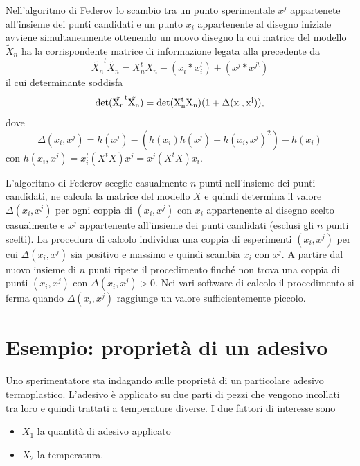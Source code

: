 \documentclass[
  11pt,
]{book}
\providecommand{\tightlist}{%
  \setlength{\itemsep}{0pt}\setlength{\parskip}{0pt}}
\begin{document}
Nell'algoritmo di Federov lo scambio tra un punto sperimentale \(x^j\) appartenete all'insieme dei punti candidati e un punto \(x_i\) appartenente al disegno iniziale avviene simultaneamente ottenendo un nuovo disegno la cui matrice del modello \(\tilde{X}_n\) ha la corrispondente matrice di informazione legata alla precedente da
\begin{equation*}
    \tilde{X_n}^t\tilde{X_n}=X^t_{n}X_{n}-(x_i*x_i^t)+(x^j*x^{jt})
\end{equation*}
il cui determinante soddisfa
\begin{equation*}
    \rm{det}(\tilde{X_n}^t\tilde{X_n})=\rm{det}(X^t_{n}X_{n})(1+\Delta(x_i,x^j)),
\end{equation*}
dove
\begin{equation*}
    \Delta(x_i,x^j)=h(x^j)-(h(x_i)h(x^j)-h(x_i,x^j)^2)-h(x_i)
\end{equation*}
con \(h(x_i,x^j)=x_i^t(X^tX)x^j=x^j(X^tX)x_i.\)

L'algoritmo di Federov sceglie casualmente \(n\) punti nell'insieme dei punti candidati, ne calcola la matrice del modello \(X\) e quindi determina il valore \(\Delta(x_i,x^j)\) per ogni coppia di \((x_i,x^j)\) con \(x_i\) appartenente al disegno scelto casualmente e \(x^j\) appartenente all'insieme dei punti candidati (esclusi gli \(n\) punti scelti). La procedura di calcolo individua una coppia di esperimenti \((x_i,x^j)\) per cui \(\Delta(x_i,x^j)\) sia positivo e massimo e quindi scambia \(x_i\) con \(x^j\). A partire dal nuovo insieme di \(n\) punti ripete il procedimento finché non trova una coppia di punti \((x_i,x^j)\) con \(\Delta(x_i,x^j)>0\). Nei vari software di calcolo il procedimento si ferma quando \(\Delta(x_i,x^j)\) raggiunge un valore sufficientemente piccolo.

\hypertarget{esempio-proprietuxe0-di-un-adesivo}{%
\section{Esempio: proprietà di un adesivo}\label{esempio-proprietuxe0-di-un-adesivo}}

Uno sperimentatore sta indagando sulle proprietà di un
particolare adesivo termoplastico. L'adesivo è applicato su due parti di pezzi che vengono incollati tra loro e quindi trattati a temperature diverse. I
due fattori di interesse sono

\begin{itemize}
\tightlist
\item
  \(X_1\) la quantità di adesivo applicato
\item
  \(X_2\) la temperatura.
\end{itemize}
\end{document}
